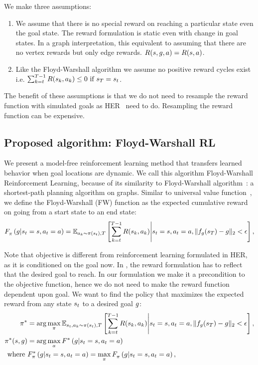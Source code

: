 We make three assumptions:
\begin{enumerate}
\item We assume that there is no special reward
  on reaching a particular state even the goal state. The reward formulation is
  static even with change in goal states.
  In a graph interpretation, this equivalent to assuming that there are no
  vertex rewards but only edge rewards.
  $\Rew(\state, \goal, \act) = \Rew(\state, \act)$.
\item Like the Floyd-Warshall algorithm we assume no positive reward cycles
  exist i.e. $  \sum_{k=t}^{T-1} \Rew(\state_k, \act_k) \le 0 \text{ if }\state_T = \state_t$.
\end{enumerate}

The benefit of these assumptions is that we do not need to resample the reward
function with simulated goals as HER~\cite{andrychowicz2016learning} need to do.
Resampling the reward function can be expensive.

\subsection{Proposed algorithm: Floyd-Warshall RL}

We present a model-free reinforcement learning method that transfers
learned behavior when goal locations are dynamic. We call this algorithm
Floyd-Warshall Reinforcement Learning, because of its similarity to
Floyd-Warshall algorithm~\cite{floydwarshall1962}:
a shortest-path planning algorithm on graphs. Similar
to universal value function~\cite{schaul2015universal}, we define the Floyd-Warshall
(FW) function as the expected cumulative reward on going from a start
state to an end state:
%
\begin{align}
\fwargs{\state_t = \state}{\act_t = \act}{\goal}{\policy}{} =
\E_{\act_k \sim \policy(\state_t),T}\left[ \sum_{k=t}^{T-1} \Rew(\state_k, \act_k) \middle\vert \state_t = \state, \act_t = \act, \|f_\goal(\state_T) - \goal\|_2 < \epsilon \right] ,
\end{align}%
%

Note that objective is different from reinforcement learning formulated in HER,
as it is conditioned on the goal now. In \citet{andrychowicz2016learning}, the
reward formulation has to reflect that the desired goal to reach. In our formulation
we make it a precondition to the objective function, hence we do not need to
make the reward function dependent upon goal.
We want to find the policy that maximizes the expected reward from any
state $\state_t$ to a desired goal $\goal$:
%
\begin{align}
  \policy^* &=
\arg \max_{\policy} \E_{\state_t, \act_k \sim \policy(\state_t), T}\left[ \sum_{k=t}^{T-1} \Rew(\state_k, \act_k) \middle\vert \state_t = \state, \act_t = \act, \|f_\goal(\state_T) - \goal\|_2 < \epsilon \right],
  \\
  \policy^*(\state, \goal) &= \arg \max_{\act} \fwargs{\state_t = \state}{\act_t = \act}{\goal}{}{*}\\
\text{where } &\fwargs{\state_t = \state}{\act_t = \act}{\goal}{\policy}{*} = 
\max_{\policy} \fwargs{\state_t = \state}{\act_t = \act}{\goal}{\policy}{},
\end{align}%
%

